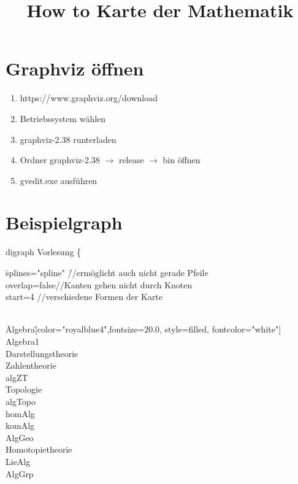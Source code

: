 \documentclass{article}
\title{How to Karte der Mathematik}
\author{}
\date{}
\begin{document}
\maketitle
\section{Graphviz öffnen}

\begin{enumerate}
    \item https://www.graphviz.org/download
    \item Betriebssystem wählen
    \item graphviz-2.38 runterladen
    \item Ordner graphviz-2.38 $\rightarrow$ release $\rightarrow$ bin öffnen
    \item gvedit.exe ausführen 
\end{enumerate}


\section{Beispielgraph}

digraph Vorlesung \{
\begin{tabbing}
\=splines="spline"\hspace{3cm} \=//ermöglicht auch nicht gerade Pfeile\\
\>overlap=false\>//Kanten gehen nicht durch Knoten\\ 
\>start=4	\>//verschiedene Formen der Karte\\
\>\>\\
\end{tabbing}
\begin{tabbing}
\=Algebra\hspace{2cm}\= [color="royalblue4",fontsize=20.0, style=filled, fontcolor="white"]\\
\>Algebra1\> [shape=box,label="Algebra 1"]    \\
\>Darstellungstheorie \\
\>Zahlentheorie \>		[shape=box]  \\
\>algZT\>[label="Algebraische Zahlentheorie"] \\
\>Topologie \>	[shape=box]  \\
\>algTopo \>[shape=box, label="Algebraische Topologie"]\\
\>homAlg \>[label="Homologische Algebra"] \\
\>komAlg\>[label="Kommutative Algebra"]\\
\>AlgGeo\>[label="Algebraische Geometrie"]\\
\>Homotopietheorie\\
\>LieAlg \>	[label="Lie Algebren"]\\
\>	AlgGrp\>[label="Algebraische Gruppen"]  \\
\end{tabbing}
\end{document}
